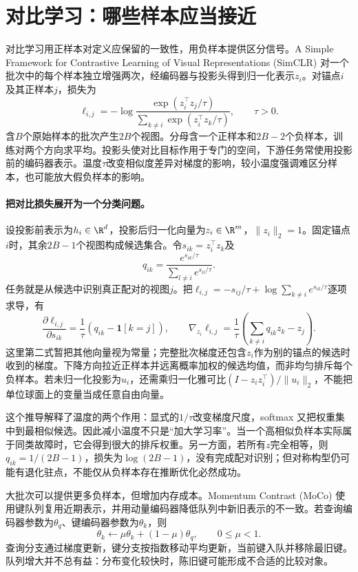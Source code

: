 \section{对比学习：哪些样本应当接近}
对比学习用正样本对定义应保留的一致性，用负样本提供区分信号。A Simple Framework for Contrastive Learning of Visual Representations (SimCLR) 对一个批次中的每个样本独立增强两次，经编码器与投影头得到归一化表示$z_i$\cite{chen2020simclr}。对锚点$i$及其正样本$j$，损失为
\begin{equation}
 \ell_{i,j}=-\log
 \frac{\exp(z_i^\top z_j/\tau)}
 {\sum_{k\ne i}\exp(z_i^\top z_k/\tau)},\qquad \tau>0.
\end{equation}
含$B$个原始样本的批次产生$2B$个视图。分母含一个正样本和$2B-2$个负样本，训练对两个方向求平均。投影头使对比目标作用于专门的空间，下游任务常使用投影前的编码器表示。温度$\tau$改变相似度差异对梯度的影响，较小温度强调难区分样本，也可能放大假负样本的影响。

\paragraph{把对比损失展开为一个分类问题。}
设投影前表示为$h_i\in\R^d$，投影后归一化向量为$z_i\in\R^m$，$\|z_i\|_2=1$。固定锚点$i$时，其余$2B-1$个视图构成候选集合。令$s_{ik}=z_i^\top z_k$及
\begin{equation}
 q_{ik}=\frac{e^{s_{ik}/\tau}}{\sum_{l\ne i}e^{s_{il}/\tau}}.
\end{equation}
任务就是从候选中识别真正配对的视图$j$。把$\ell_{i,j}=-s_{ij}/\tau+\log\sum_{k\ne i}e^{s_{ik}/\tau}$逐项求导，有
\begin{equation}
 \frac{\partial\ell_{i,j}}{\partial s_{ik}}
 =\frac1\tau(q_{ik}-\mathbf1[k=j]),\qquad
 \nabla_{z_i}\ell_{i,j}
 =\frac1\tau\left(\sum_{k\ne i}q_{ik}z_k-z_j\right).
\end{equation}
这里第二式暂把其他向量视为常量；完整批次梯度还包含$z_i$作为别的锚点的候选时收到的梯度。下降方向拉近正样本并远离概率加权的候选均值，而非均匀排斥每个负样本。若未归一化投影为$u_i$，还需乘归一化雅可比$(I-z_iz_i^\top)/\|u_i\|_2$，不能把单位球面上的变量当成任意自由向量。

这个推导解释了温度的两个作用：显式的$1/\tau$改变梯度尺度，softmax 又把权重集中到最相似候选。因此减小温度不只是“加大学习率”。当一个高相似负样本实际属于同类故障时，它会得到很大的排斥权重。另一方面，若所有$z$完全相等，则$q_{ik}=1/(2B-1)$，损失为$\log(2B-1)$，没有完成配对识别；但对称构型仍可能有退化驻点，不能仅从负样本存在推断优化必然成功。

大批次可以提供更多负样本，但增加内存成本。Momentum Contrast (MoCo) 使用键队列复用近期表示，并用动量编码器降低队列中新旧表示的不一致\cite{he2020moco}。若查询编码器参数为$\theta_q$、键编码器参数为$\theta_k$，则
\begin{equation}
 \theta_k\leftarrow\mu\theta_k+(1-\mu)\theta_q,\qquad 0\leq\mu<1.
\end{equation}
查询分支通过梯度更新，键分支按指数移动平均更新，当前键入队并移除最旧键。队列增大并不总有益：分布变化较快时，陈旧键可能形成不合适的比较对象。

